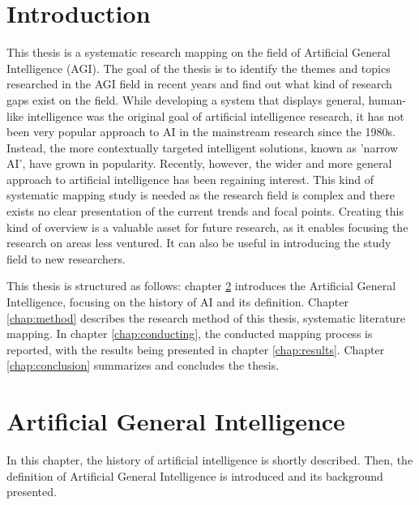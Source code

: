\documentclass[utf8,english]{gradu3}
\begin{document}
\maketitle

\mainmatter

\chapter{Introduction}
This thesis is a systematic research mapping on the field of Artificial
General Intelligence (AGI). The goal of the thesis is to identify the themes and
topics researched in the AGI field in recent years and find out what kind of
research gaps exist on the field. While developing a system that displays
general, human-like intelligence was the original goal of artificial
intelligence research, it has not been very popular approach to AI in the
mainstream research since the 1980s. Instead, the more contextually targeted
intelligent solutions, known as 'narrow AI', have grown in popularity. Recently,
however, the wider and more general approach to artificial intelligence has been
regaining interest. This kind of systematic mapping study is needed as the
research field is complex and there exists no clear presentation of the current
trends and focal points. Creating this kind of overview is a valuable
asset for future research, as it enables focusing the research on areas
less ventured. It can also be useful in introducing the study field to new
researchers.

This thesis is structured as follows: chapter \ref{chap:agi} introduces the
Artificial General Intelligence, focusing on the history of AI and its
definition. Chapter \ref*{chap:method} describes the research method of this
thesis, systematic literature mapping. In chapter \ref*{chap:conducting}, the
conducted mapping process is reported, with the results being presented in
chapter \ref*{chap:results}. Chapter \ref{chap:conclusion} summarizes and
concludes the thesis.

\chapter{Artificial General Intelligence}
\label{chap:agi}

In this chapter, the history of artificial intelligence is shortly described.
Then, the definition of Artificial General Intelligence is introduced and its
background presented.
\end{document}
